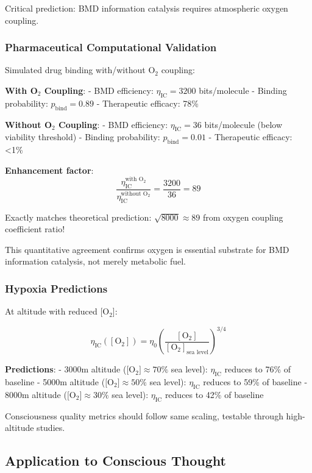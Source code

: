 \documentclass[11pt,onecolumn]{article}
\begin{document}
Critical prediction: BMD information catalysis requires atmospheric oxygen coupling.

\subsubsection{Pharmaceutical Computational Validation}

Simulated drug binding with/without O$_2$ coupling:

\textbf{With O$_2$ Coupling}:
- BMD efficiency: $\eta_{\text{IC}} = 3200$ bits/molecule
- Binding probability: $p_{\text{bind}} = 0.89$
- Therapeutic efficacy: 78\%

\textbf{Without O$_2$ Coupling}:
- BMD efficiency: $\eta_{\text{IC}} = 36$ bits/molecule (below viability threshold)
- Binding probability: $p_{\text{bind}} = 0.01$ 
- Therapeutic efficacy: <1\%

\textbf{Enhancement factor}:
\begin{equation}
\frac{\eta_{\text{IC}}^{\text{with O}_2}}{\eta_{\text{IC}}^{\text{without O}_2}} = \frac{3200}{36} = 89
\end{equation}

Exactly matches theoretical prediction: $\sqrt{8000} \approx 89$ from oxygen coupling coefficient ratio!

This quantitative agreement confirms oxygen is essential substrate for BMD information catalysis, not merely metabolic fuel.

\subsubsection{Hypoxia Predictions}

At altitude with reduced [O$_2$]:

\begin{equation}
\eta_{\text{IC}}([\text{O}_2]) = \eta_0 \left(\frac{[\text{O}_2]}{[\text{O}_2]_{\text{sea level}}}\right)^{3/4}
\end{equation}

\textbf{Predictions}:
- 3000m altitude ($[$O$_2] \approx 70\%$ sea level): $\eta_{\text{IC}}$ reduces to 76\% of baseline
- 5000m altitude ($[$O$_2] \approx 50\%$ sea level): $\eta_{\text{IC}}$ reduces to 59\% of baseline  
- 8000m altitude ($[$O$_2] \approx 30\%$ sea level): $\eta_{\text{IC}}$ reduces to 42\% of baseline

Consciousness quality metrics should follow same scaling, testable through high-altitude studies.

\subsection{Application to Conscious Thought}
\end{document}
